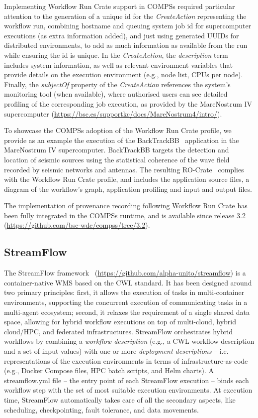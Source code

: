 \documentclass[10pt,letterpaper]{article}
\begin{document}
Implementing Workflow Run Crate support in COMPSs required particular attention to the generation of a unique id for the \emph{CreateAction} representing the workflow run, combining hostname and queuing system job id for supercomputer executions (as extra information added), and just using generated UUIDs for distributed environments, to add as much information as available from the run while ensuring the id is unique.
In the \emph{CreateAction}, the \emph{description} term includes system information, as well as relevant environment variables that provide details on the execution environment (e.g., node list, CPUs per node).
Finally, the \emph{subjectOf} property of the \emph{CreateAction} references the system’s monitoring tool (when available),
where authorised users can see detailed profiling of the corresponding job execution, as provided by the MareNostrum IV supercomputer (\url{https://bsc.es/supportkc/docs/MareNostrum4/intro/}).

To showcase the COMPSs adoption of the Workflow Run Crate profile, we provide as an example the execution of the BackTrackBB~\cite{Poiata 2016}
application in the MareNostrum IV supercomputer.
BackTrackBB targets the detection and location of seismic sources using the statistical coherence of the wave field recorded by seismic networks and antennas.
The resulting RO-Crate~\cite{Poiata 2023} complies with the Workflow Run Crate profile, and includes the application source files, a diagram of the workflow's graph, application profiling and input and output files.

The implementation of provenance recording following Workflow Run Crate has been fully integrated in the COMPSs runtime, and is available since release 3.2 \cite{Ejarque 2023} (\url{https://github.com/bsc-wdc/compss/tree/3.2}).


\subsection{StreamFlow}\label{streamflow}

The StreamFlow framework~\cite{Colonnelli 2020} (\url{https://github.com/alpha-unito/streamflow}) is a container-native WMS based on the CWL standard.
It has been designed around two primary principles: first, it allows the execution of tasks in multi-container environments, supporting the concurrent execution of communicating tasks in a multi-agent ecosystem; second, it relaxes the requirement of a single shared data space, allowing for hybrid workflow executions on top of multi-cloud, hybrid cloud/HPC, and federated infrastructures.
StreamFlow orchestrates hybrid workflows by combining a \emph{workflow description} (e.g., a CWL workflow description and a set of input values) with one or more \emph{deployment descriptions} -- i.e.
representations of the execution environments in terms of infrastructure-as-code (e.g., Docker Compose files, HPC batch scripts, and Helm charts).
A streamflow.yml file -- the entry point of each StreamFlow execution -- binds each workflow step with the set of most suitable execution environments.
At execution time, StreamFlow automatically takes care of all the secondary aspects, like scheduling, checkpointing, fault tolerance, and data movements.
\end{document}
